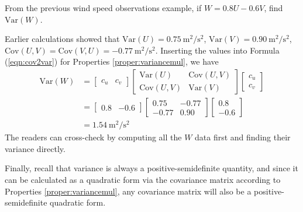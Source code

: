 \begin{exmp}
From the previous wind speed observations example, if $W = 0.8U-0.6V$, find $\text{Var}(W)$.
\end{exmp}
\begin{solution}
Earlier calculations showed that $\text{Var}(U) = \SI{0.75}{\square\m \per \square\s}$,
$\text{Var}(V) = \SI{0.90}{\square\m \per \square\s}$, $\text{Cov}(U,V) = \text{Cov}(V,U) = \SI{-0.77}{\square\m \per \square\s}$. Inserting the values into Formula  (\ref{eqn:cov2var}) for Properties \ref{proper:variancemul}, we have
\begin{align*}
\text{Var}(W) &=
\begin{bmatrix}
c_u & c_v
\end{bmatrix}
\begin{bmatrix}
\text{Var}(U) & \text{Cov}(U,V) \\
\text{Cov}(U,V) & \text{Var}(V)
\end{bmatrix}
\begin{bmatrix}
c_u \\
c_v
\end{bmatrix} \\
&=
\begin{bmatrix}
0.8 & -0.6
\end{bmatrix}
\begin{bmatrix}
0.75 & -0.77 \\
-0.77 & 0.90
\end{bmatrix}
\begin{bmatrix}
0.8 \\
-0.6
\end{bmatrix} \\
&= \SI{1.54}{\square\m \per \square\s}
\end{align*} 
The readers can cross-check by computing all the $W$ data first and finding their variance directly.
\end{solution}
Finally, recall that variance is always a positive-semidefinite quantity, and since it can be calculated as a quadratic form via the covariance matrix according to Properties \ref{proper:variancemul}, any covariance matrix will also be a positive-semidefinite quadratic form.

